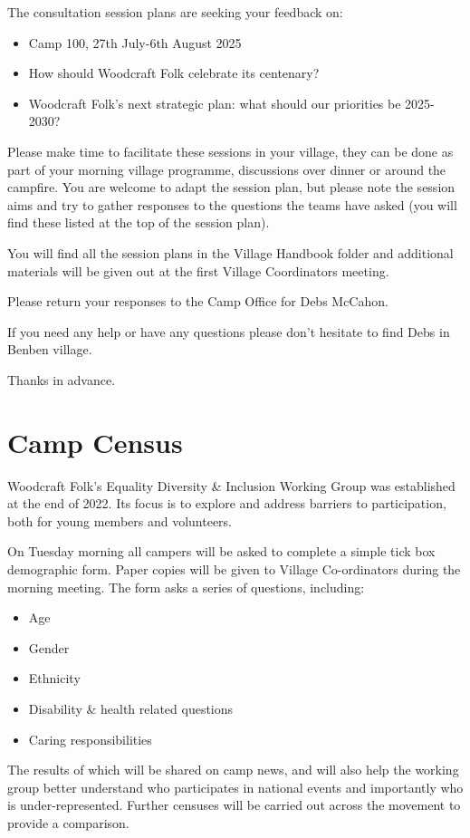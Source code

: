 \documentclass[a4paper, 11pt]{report}
\begin{document}
The consultation session plans are seeking your feedback on:
\begin{itemize}
    \item Camp 100, 27th July-6th August 2025
    \item How should Woodcraft Folk celebrate its centenary?
    \item Woodcraft Folk's next strategic plan: what should our priorities be 2025-2030?
\end{itemize}

Please make time to facilitate these sessions in your village, they can be done as part of your morning village programme, discussions over dinner or around the campfire. You are welcome to adapt the session plan, but please note the session aims and try to gather responses to the questions the teams have asked (you will find these listed at the top of the session plan).

You will find all the session plans in the Village Handbook folder and additional materials will be given out at the first Village Coordinators meeting.\nl

Please return your responses to the Camp Office for Debs McCahon.\nl

If you need any help or have any questions please don't hesitate to find Debs in Benben village.

Thanks in advance.\nl

\chapter{Camp Census}
Woodcraft Folk's Equality Diversity \& Inclusion Working Group was established at the end of 2022. Its focus is to explore and address barriers to participation, both for young members and volunteers. \nl

On Tuesday morning all campers will be asked to complete a simple tick box demographic form. Paper copies will be given to Village Co-ordinators during the morning meeting. The form asks a series of questions, including:
\begin{itemize}
    \item Age 
    \item Gender
    \item Ethnicity
    \item Disability \& health related questions
    \item Caring responsibilities
\end{itemize}

The results of which will be shared on camp news, and will also help the working group better understand who participates in national events and importantly who is under-represented. Further censuses will be carried out across the movement to provide a comparison.\nl
\end{document}
